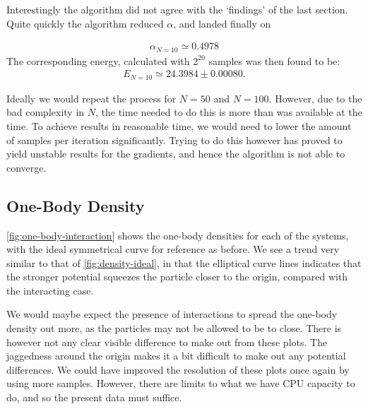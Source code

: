 \documentclass[twocolumn]{article}
\begin{document}
Interestingly the algorithm did not agree with the {\lq findings\rq} of the last
section. Quite quickly the algorithm reduced $\alpha$, and landed finally on

\begin{align}
    \alpha_{N=10} \simeq 0.4978
\end{align}
The corresponding energy, calculated with $2^{20}$ samples was then found to be:
\begin{align}
    E_{N=10} \simeq 24.3984 \pm 0.00080.
\end{align}

Ideally we would repeat the process for $N=50$ and $N=100$. However, due to the
bad complexity in $N$, the time needed to do this is more than was available at
the time. To achieve results in reasonable time, we would need to lower the
amount of samples per iteration significantly. Trying to do this however has
proved to yield unstable results for the gradients, and hence the algorithm is
not able to converge. 


\subsection{One-Body Density}

\autoref{fig:one-body-interaction} shows the one-body densities for each of the
systems, with the ideal symmetrical curve for reference as before. We see a
trend very similar to that of \autoref{fig:density-ideal}, in that the
elliptical curve lines indicates that the stronger potential squeezes the
particle closer to the origin, compared with the interacting case. 

We would maybe expect the presence of interactions to spread the one-body
density out more, as the particles may not be allowed to be to close. There is
however not any clear visible difference to make out from these plots. The
jaggedness around the origin makes it a bit difficult to make out any potential
differences. We could have improved the resolution of these plots once again by
using more samples. However, there are limits to what we have CPU capacity to
do, and so the present data must suffice.
\end{document}
